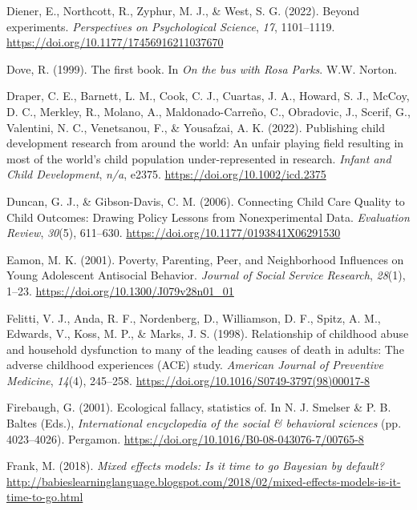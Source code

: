 \documentclass[
  letterpaper,
  DIV=11,
  numbers=noendperiod]{scrreprt}
\newlength{\cslhangindent}
\newenvironment{CSLReferences}[2] %
 {\begin{list}{}{%
  \setlength{\itemindent}{0pt}
  \setlength{\leftmargin}{0pt}
  \setlength{\parsep}{0pt}
  \ifodd #1
   \setlength{\leftmargin}{\cslhangindent}
   \setlength{\itemindent}{-1\cslhangindent}
  \fi
  \setlength{\itemsep}{#2\baselineskip}}}
 {\end{list}}
\begin{document}
\begin{CSLReferences}{1}{0}
Diener, E., Northcott, R., Zyphur, M. J., \& West, S. G. (2022). Beyond
experiments. \emph{Perspectives on Psychological Science}, \emph{17},
1101--1119. \url{https://doi.org/10.1177/17456916211037670}

Dove, R. (1999). The first book. In \emph{On the bus with {R}osa
{P}arks}. W.W. Norton.

Draper, C. E., Barnett, L. M., Cook, C. J., Cuartas, J. A., Howard, S.
J., McCoy, D. C., Merkley, R., Molano, A., Maldonado-Carreño, C.,
Obradovic, J., Scerif, G., Valentini, N. C., Venetsanou, F., \&
Yousafzai, A. K. (2022). Publishing child development research from
around the world: An unfair playing field resulting in most of the
world's child population under-represented in research. \emph{Infant and
Child Development}, \emph{n/a}, e2375.
\url{https://doi.org/10.1002/icd.2375}

Duncan, G. J., \& Gibson-Davis, C. M. (2006). {Connecting Child Care
Quality to Child Outcomes: Drawing Policy Lessons from Nonexperimental
Data}. \emph{Evaluation Review}, \emph{30}(5), 611--630.
\url{https://doi.org/10.1177/0193841X06291530}

Eamon, M. K. (2001). {Poverty, Parenting, Peer, and Neighborhood
Influences on Young Adolescent Antisocial Behavior}. \emph{Journal of
Social Service Research}, \emph{28}(1), 1--23.
\url{https://doi.org/10.1300/J079v28n01_01}

Felitti, V. J., Anda, R. F., Nordenberg, D., Williamson, D. F., Spitz,
A. M., Edwards, V., Koss, M. P., \& Marks, J. S. (1998). Relationship of
childhood abuse and household dysfunction to many of the leading causes
of death in adults: The adverse childhood experiences (ACE) study.
\emph{American Journal of Preventive Medicine}, \emph{14}(4), 245--258.
\url{https://doi.org/10.1016/S0749-3797(98)00017-8}

Firebaugh, G. (2001). Ecological fallacy, statistics of. In N. J.
Smelser \& P. B. Baltes (Eds.), \emph{International encyclopedia of the
social \& behavioral sciences} (pp. 4023--4026). Pergamon.
\url{https://doi.org/10.1016/B0-08-043076-7/00765-8}

Frank, M. (2018). \emph{Mixed effects models: Is it time to go
{B}ayesian by default?}
\url{http://babieslearninglanguage.blogspot.com/2018/02/mixed-effects-models-is-it-time-to-go.html}


\end{CSLReferences}
\end{document}
